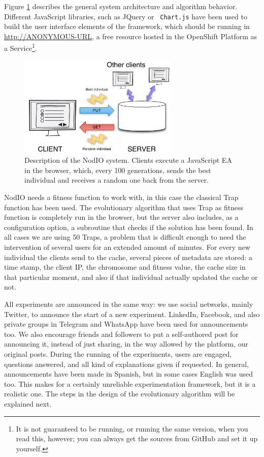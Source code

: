 \documentclass[runningheads,a4paper]{llncs}\usepackage[]{graphicx}\usepackage[]{color}
\begin{document}
Figure \ref{fig:system} describes the general system architecture and
algorithm behavior. Different JavaScript libraries, such as JQuery or {\tt
  Chart.js} have been used to build the user interface elements of the
framework, which should be running in \url{http://ANONYMOUS-URL}, 
a free resource hosted in the
OpenShift Platform as a Service\footnote{It is not guaranteed to be running,
or running the same version, when you read this, however; you can always get
the sources from GitHub and set it up yourself.}.
%
\begin{figure}[!t]
\centering
\includegraphics[width=3in]{system.pdf}
\caption{Description of the NodIO system. Clients execute a JavaScript EA
  in the browser, which, every 100 generations, sends the best
  individual and receives a random one back from the server.}
\label{fig:system}
\end{figure}

NodIO needs a fitness function to work with, in this case the classical Trap 
function \cite{Ackley1987} has been used. 
The evolutionary algorithm that uses Trap as fitness function is
completely run in the
browser, but the server also includes, as a configuration
option, a subroutine that checks if the solution has been
found. In all cases we are using 50 Traps, a problem
that is difficult enough to need the intervention of several users for
an extended amount of minutes. %
For every new individual the clients send to the cache, several
pieces of metadata are stored: a time stamp, the client IP, the chromosome and
fitness value, the cache size in that particular moment, and also if that
individual actually updated the cache or not. 

All experiments are announced in the same way: we use social networks,
mainly Twitter, to announce the start of a new experiment. LinkedIn,
Facebook, and also private groups in Telegram and WhatsApp have been
used for announcements too. We also encourage friends and followers to
put a self-authored post for announcing it, instead of just sharing, in
the way allowed by the platform, our original posts. During the running
of the experiments, users are engaged, questions answered, and all
kind of explanations given if requested. In general, announcements
have been made in Spanish, but in some cases English was used
too. This makes for a certainly unreliable experimentation framework,
but it is a realistic one. The steps in the design of the evolutionary
algorithm will be explained next.
\end{document}
